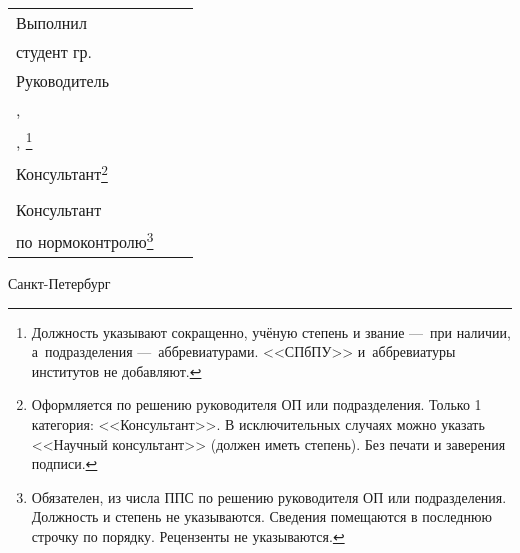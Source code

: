 \vspace{4mm plus2fill}%

\noindent
\begin{tabularx}{\linewidth}{lXl}
	Выполнил              &	   &             \\
	студент гр.~\group     &    & \Author     \\[\mfloatsep]

	Руководитель 		  &    &             \\
	\SupervisorJob,		  &    &             \\
	\SupervisorDegree, \SupervisorTitle\footnote{Должность указывают сокращенно, учёную степень и звание ---~при наличии, а~подразделения ---~аббревиатурами. <<СПбПУ>> и~аббревиатуры институтов не добавляют.} 	  &    & \Supervisor \\[\mfloatsep]
	
	Консультант\footnote{Оформляется по решению руководителя ОП или подразделения. Только 1 категория: <<Консультант>>. В исключительных случаях можно указать <<Научный консультант>> (должен иметь степень). Без печати и заверения подписи.}		  &    & 			 \\
	\ConsultantExtraDegree 	  &    & \ConsultantExtra\\[\mfloatsep]
	
	Консультант  &    &  \\   	
	по нормоконтролю\footnote{Обязателен, из числа ППС по решению руководителя ОП или подразделения. Должность и степень не указываются. Сведения помещаются в последнюю строчку по порядку. Рецензенты не указываются.}  		 	  &    & \ConsultantNorm  %
\end{tabularx} %


%
\vspace{0pt plus4fill}%


\begin{center}%
Санкт-Петербург\\
\thesisYear
\end{center}%
\restoregeometry
\newpage